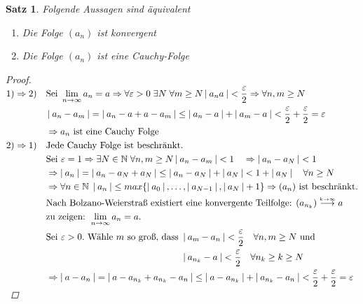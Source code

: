 \documentclass[a4paper,titlepage,oneside]{article}
\def\N{\ensuremath{\mathbb{N}} }
\renewcommand{\epsilon}{\ensuremath{\varepsilon} }
\def\zz{\text{zu zeigen: }}
\def\sp{\hspace{0,1cm}}
\renewcommand{\liminf}[2][n]{\ensuremath{\lim\limits_{#1 \rightarrow \infty}{#2}}}
\newcommand{\abs}[1]{\ensuremath{\left|\:#1\:\right|}}
\newcommand{\longtoinf}[1][n]{\ensuremath{\overset{\scriptscriptstyle{#1 \to \infty}}{\longrightarrow}}}
\theoremstyle{thmstyle}
\newtheorem{satz}{Satz}[subsection]
\begin{document}
\begin{satz}
Folgende Aussagen sind äquivalent
\begin{enumerate}
\item Die Folge \((a_n)\) ist konvergent
\item Die Folge \((a_n)\) ist eine Cauchy-Folge
\end{enumerate}
\begin{proof}
\begin{math} \displaystyle
\begin{aligned}[t]
1) \Rightarrow 2) \quad &\text{Sei }\liminf{a_n} = a \Rightarrow \forall \epsilon > 0 \sp \exists N \sp \forall m \ge N \abs{a_n a} < \frac{\epsilon}{2} \Rightarrow \forall n, m \ge N \\
&\abs{a_n - a_m} = \abs{a_n - a + a - a_m} \le \abs{a_n - a }  + \abs{a_m - a} <  \frac{\epsilon}{2}+ \frac{\epsilon}{2} = \epsilon \\
&\Rightarrow a_n \text{ ist eine Cauchy Folge}\\
2) \Rightarrow 1) \quad &\text{Jede Cauchy Folge ist beschränkt.} \\
& \text{Sei } \epsilon = 1 \Rightarrow \exists N \in \N \sp \forall n, m \ge N \abs{a_n - a_m} < 1 \quad \Rightarrow \abs{a_n - a_N} < 1 \\
&\Rightarrow \abs{a_n} = \abs{a_n - a_N + a_N} \le \abs{a_n - a_N} + \abs{a_N} < 1 + \abs{a_N} \quad \forall n  \ge N\\
&\Rightarrow \forall n \in \N \sp \abs{a_n} \le max\{\abs{a_0},\dots,\abs{a_{N-1}},\abs{a_N} + 1\} \Rightarrow (a_n) \text{ ist beschränkt.}\\
&\text{Nach Bolzano-Weierstraß existiert eine konvergente Teilfolge: } (a_{n_k}) \longtoinf[k] a\\
&\zz \liminf{a_n} = a.\\
&\text{Sei }\epsilon > 0. \text{ Wähle $m$ so groß, dass }\begin{aligned}[t]&\abs{a_m - a_n} < \frac{\epsilon}{2} \quad \forall n,m \ge N \text{ und } \\
&\abs{a_{n_k} - a} < \frac{\epsilon}{2} \quad \forall n_k \ge k \ge N \end{aligned} \\
&\Rightarrow \abs{a-a_n} = \abs{a - a_{n_k} + a_{n_k} - a_n} \le \abs{a- a_{n_k}} + \abs{a_{n_k} - a_n} < \frac{\epsilon}{2} + \frac{\epsilon}{2} = \epsilon
\end{aligned}\\
\end{math}
\end{proof}
\end{satz}
\end{document}
